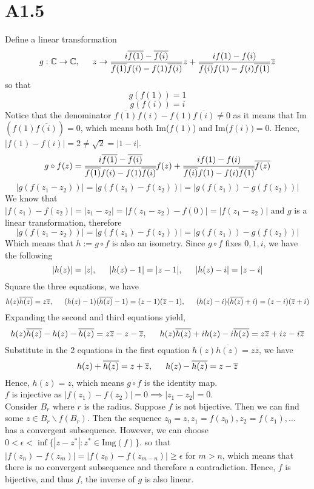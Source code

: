 \documentclass[11pt]{article}
\begin{document}
\section*{A1.5}
Define a linear transformation 
\[
    g: \mathbb{C} \to \mathbb{C}, \indent z \to \frac{i\overline{f(1)} - \overline{f(i)}}{\overline{f(1)}f(i) - f(1)\overline{f(i)}} z + \frac{if(1) - f(i)}{\overline{f(i)}f(1) - f(i)\overline{f(1)}} \overline{z}
\]
so that 
\[
    g(f(1)) = 1
\]
\[
    g(f(i)) = i    
\]
Notice that the denominator $\overline{f(1)}f(i) - f(1)\overline{f(i)} \ne 0$ as it means that Im$(f(1)\overline{f(i)}) = 0$, which means both Im($f(1)$) and Im($f(i)) = 0$. Hence, $|f(1)-f(i)| = 2 \ne \sqrt{2} = |1-i|$.\\
\begin{equation*}
    \begin{aligned}
        g \circ f(z) &= \cfrac{i\overline{f(1)} - \overline{f(i)}}{\overline{f(1)}f(i) - f(1)\overline{f(i)}}f(z) + \cfrac{if(1) - f(i)}{\overline{f(i)}f(1) - f(i)\overline{f(1)}} \overline{f(z)} \\
    \end{aligned}
\end{equation*}
\[
    |g(f(z_1 -z_2))|=  |g(f(z_1) -f(z_2))| = |g(f(z_1)) -g(f(z_2))|
\]
We know that $|f(z_1)-f(z_2)| = |z_1-z_2| = |f(z_1-z_2) - f(0)| = |f(z_1-z_2)|$ and $g$ is a linear transformation, therefore
\[
    |g(f(z_1-z_2))| = |g(f(z_1) - f(z_2))| = |g(f(z_1)) - g(f(z_2))|
\]
Which means that $h:=g\circ f$ is also an isometry. Since $g \circ f$ fixes $0,1,i$, we have the following
\[
    |h(z)| = |z|, \indent |h(z) - 1| = |z-1|, \indent |h(z)-i| = |z-i|
\]
Square the three equations, we have
\[
    h(z) \overline{h(z)} = z \overline{z}, \indent (h(z)-1)(\overline{h(z)}-1) =(z-1)(\overline{z}-1), \indent (h(z)-i)(\overline{h(z)}+i) =(z-i)(\overline{z}+i)
\]
Expanding the second and third equations yield, 
\[
    h(z)\overline{h(z)} - h(z) - \overline{h(z)} = z\overline{z} -z - \overline{z}, \indent h(z)\overline{h(z)} + ih(z) - i\overline{h(z)} = z\overline{z} +iz - i\overline{z} 
\]
Substitute in the 2 equations in the first equation $h(z)\overline{h(z)} = z \overline{z}$, we have
\[
    h(z)+\overline{h(z)} = z + \overline{z}, \indent h(z) - \overline{h(z)} = z - \overline{z}
\]
Hence, $h(z) = z$, which means $g\circ f$ is the identity map. \\
$f$ is injective as $|f(z_1) - f(z_2)| = 0 \implies |z_1 - z_2|=0$. \\
Consider $B_r$ where $r$ is the radius. Suppose $f$ is not bijective. Then we can find some $z \in B_r \backslash f(B_r)$. Then the sequence $z_0 = z,z_1 = f(z_0),z_2 = f(z_1), \hdots$ has a convergent subsequence. However, we can choose $0< \epsilon < \inf \{|z-z^*| : z^* \in \text{Img}(f) \}$. 
so that $|f(z_n)-f(z_m)| = |f(z_0) - f(z_{m-n})| \ge \epsilon$ for $m>n$, which means that there is no convergent subsequence and therefore a contradiction. 
Hence, $f$ is bijective, and thus $f$, the inverse of $g$ is also linear.
\end{document}
